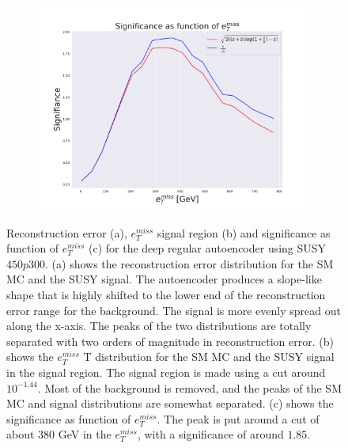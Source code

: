 \begin{figure}[h!]
    \begin{subfigure}{.49\textwidth}
        \includegraphics[width=\textwidth]{Figures/AE_testing/big/2lep/significance_etmiss_450p0p0300_-1.4360553938127363.pdf}
        \caption{}
        \label{fig:AE_2lep_big_signi_450}
    \end{subfigure}
    \hfill      
    \caption[2lep deep network | $450p300$ | AE]{Reconstruction error (a), $e_T^{miss}$ signal region (b) and significance as function of 
    $e_T^{miss}$ (c) for the deep regular autoencoder using SUSY $450p300$. 
    (a) shows the reconstruction error distribution for the SM MC and the SUSY signal. 
    The autoencoder produces a slope-like shape that is highly shifted to the lower end of the reconstruction error range
for the background. The signal is more evenly spread out along the x-axis. The peaks of the two distributions are totally separated
with two orders of magnitude in reconstruction error. (b) shows the $e_T^{miss}$
T distribution for the SM MC and the SUSY signal in the signal region. The signal region is made using a cut around
$10^{-1.44}$. Most of the background is removed, and the peaks of the SM MC and signal distributions are
somewhat separated. (c) shows the significance as function of $e_T^{miss}$. The peak is put 
around a cut of about 380 GeV in the $e_T^{miss}$, with a significance of around $1.85$.}
    \label{fig:AE_2lep_big_rec_sig_signi_450}
\end{figure}



